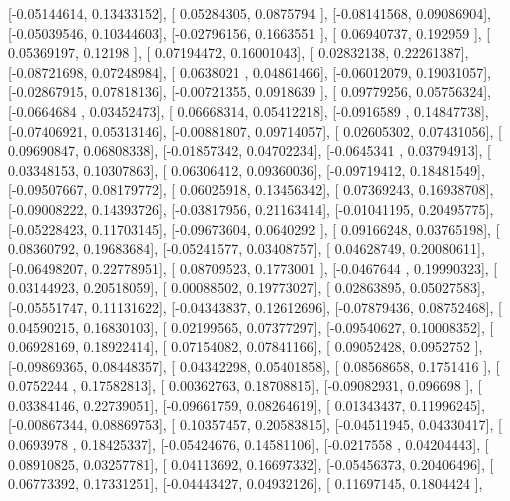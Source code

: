 \documentclass{article}
\begin{document}
       [-0.05144614,  0.13433152],
       [ 0.05284305,  0.0875794 ],
       [-0.08141568,  0.09086904],
       [-0.05039546,  0.10344603],
       [-0.02796156,  0.1663551 ],
       [ 0.06940737,  0.192959  ],
       [ 0.05369197,  0.12198   ],
       [ 0.07194472,  0.16001043],
       [ 0.02832138,  0.22261387],
       [-0.08721698,  0.07248984],
       [ 0.0638021 ,  0.04861466],
       [-0.06012079,  0.19031057],
       [-0.02867915,  0.07818136],
       [-0.00721355,  0.0918639 ],
       [ 0.09779256,  0.05756324],
       [-0.0664684 ,  0.03452473],
       [ 0.06668314,  0.05412218],
       [-0.0916589 ,  0.14847738],
       [-0.07406921,  0.05313146],
       [-0.00881807,  0.09714057],
       [ 0.02605302,  0.07431056],
       [ 0.09690847,  0.06808338],
       [-0.01857342,  0.04702234],
       [-0.0645341 ,  0.03794913],
       [ 0.03348153,  0.10307863],
       [ 0.06306412,  0.09360036],
       [-0.09719412,  0.18481549],
       [-0.09507667,  0.08179772],
       [ 0.06025918,  0.13456342],
       [ 0.07369243,  0.16938708],
       [-0.09008222,  0.14393726],
       [-0.03817956,  0.21163414],
       [-0.01041195,  0.20495775],
       [-0.05228423,  0.11703145],
       [-0.09673604,  0.0640292 ],
       [ 0.09166248,  0.03765198],
       [ 0.08360792,  0.19683684],
       [-0.05241577,  0.03408757],
       [ 0.04628749,  0.20080611],
       [-0.06498207,  0.22778951],
       [ 0.08709523,  0.1773001 ],
       [-0.0467644 ,  0.19990323],
       [ 0.03144923,  0.20518059],
       [ 0.00088502,  0.19773027],
       [ 0.02863895,  0.05027583],
       [-0.05551747,  0.11131622],
       [-0.04343837,  0.12612696],
       [-0.07879436,  0.08752468],
       [ 0.04590215,  0.16830103],
       [ 0.02199565,  0.07377297],
       [-0.09540627,  0.10008352],
       [ 0.06928169,  0.18922414],
       [ 0.07154082,  0.07841166],
       [ 0.09052428,  0.0952752 ],
       [-0.09869365,  0.08448357],
       [ 0.04342298,  0.05401858],
       [ 0.08568658,  0.1751416 ],
       [ 0.0752244 ,  0.17582813],
       [ 0.00362763,  0.18708815],
       [-0.09082931,  0.096698  ],
       [ 0.03384146,  0.22739051],
       [-0.09661759,  0.08264619],
       [ 0.01343437,  0.11996245],
       [-0.00867344,  0.08869753],
       [ 0.10357457,  0.20583815],
       [-0.04511945,  0.04330417],
       [ 0.0693978 ,  0.18425337],
       [-0.05424676,  0.14581106],
       [-0.0217558 ,  0.04204443],
       [ 0.08910825,  0.03257781],
       [ 0.04113692,  0.16697332],
       [-0.05456373,  0.20406496],
       [ 0.06773392,  0.17331251],
       [-0.04443427,  0.04932126],
       [ 0.11697145,  0.1804424 ],
\end{document}
